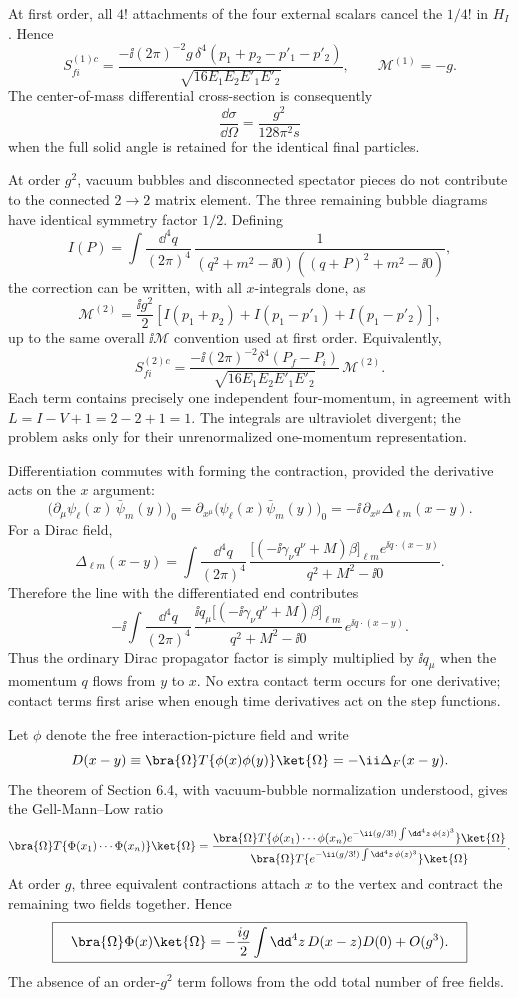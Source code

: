 \begin{enumerate}
At first order, all \(4!\) attachments of the four external scalars
cancel the \(1/4!\) in \(H_I\).  Hence
\[
 S^{(1)c}_{fi}
 =\frac{-\ii(2\pi)^{-2}g\,
 \delta^4(p_1+p_2-p'_1-p'_2)}
 {\sqrt{16E_1E_2E'_1E'_2}},
 \qquad \mathcal M^{(1)}=-g .
\]
The center-of-mass differential cross-section is consequently
\[
 \boxed{\quad
 \frac{\dd\sigma}{\dd\Omega}
 =\frac{g^2}{128\pi^2s}\quad}
\]
when the full solid angle is retained for the identical final particles.

At order \(g^2\), vacuum bubbles and disconnected spectator pieces do
not contribute to the connected \(2\to2\) matrix element.  The three
remaining bubble diagrams have identical symmetry factor \(1/2\).
Defining
\[
 I(P)=\int\frac{\dd^4q}{(2\pi)^4}\,
 \frac1{(q^2+m^2-\ii0)((q+P)^2+m^2-\ii0)},
\]
the correction can be written, with all \(x\)-integrals done, as
\[
 \mathcal M^{(2)}
 =\frac{\ii g^2}{2}\left[
 I(p_1+p_2)+I(p_1-p'_1)+I(p_1-p'_2)\right],
\]
up to the same overall \(\ii\mathcal M\) convention used at first order.
Equivalently,
\[
 S^{(2)c}_{fi}
 =\frac{-\ii(2\pi)^{-2}\delta^4(P_f-P_i)}
 {\sqrt{16E_1E_2E'_1E'_2}}\,
 \mathcal M^{(2)} .
\]
Each term contains precisely one independent four-momentum, in agreement
with \(L=I-V+1=2-2+1=1\).  The integrals are ultraviolet divergent; the
problem asks only for their unrenormalized one-momentum representation.

Differentiation commutes with forming the contraction, provided the
derivative acts on the \(x\) argument:
\[
 \bigl(\partial_\mu\psi_\ell(x)\,\bar\psi_m(y)\bigr)_0
 =\partial_{x^\mu}\bigl(\psi_\ell(x)\bar\psi_m(y)\bigr)_0
 =-\ii\,\partial_{x^\mu}\Delta_{\ell m}(x-y).
\]
For a Dirac field,
\[
 \Delta_{\ell m}(x-y)
 =\int\frac{\dd^4q}{(2\pi)^4}\,
 \frac{\bigl[(-\ii\gamma_\nu q^\nu+M)\beta\bigr]_{\ell m}
 e^{\ii q\cdot(x-y)}}{q^2+M^2-\ii0}.
\]
Therefore the line with the differentiated end contributes
\[
 -\ii\int\frac{\dd^4q}{(2\pi)^4}\,
 \frac{\ii q_\mu
 \bigl[(-\ii\gamma_\nu q^\nu+M)\beta\bigr]_{\ell m}}
 {q^2+M^2-\ii0}\,e^{\ii q\cdot(x-y)}.
\]
Thus the ordinary Dirac propagator factor is simply multiplied by
\(\ii q_\mu\) when the momentum \(q\) flows from \(y\) to \(x\).  No extra
contact term occurs for one derivative; contact terms first arise when
enough time derivatives act on the step functions.

Let \(\phi\) denote the free interaction-picture field and write
\[
 D(x-y)\equiv\bra{\Omega}T\{\phi(x)\phi(y)\}\ket{\Omega}
 =-\ii\Delta_F(x-y).
\]
The theorem of Section 6.4, with vacuum-bubble normalization understood,
gives the Gell-Mann--Low ratio
\[
 \bra{\Omega}T\{\Phi(x_1)\cdots\Phi(x_n)\}\ket{\Omega}
 =
 \frac{\bra{\Omega}T\{\phi(x_1)\cdots\phi(x_n)
 e^{-\ii(g/3!)\int \dd^4z\,\phi(z)^3}\}\ket{\Omega}}
 {\bra{\Omega}T\{e^{-\ii(g/3!)\int \dd^4z\,\phi(z)^3}\}\ket{\Omega}} .
\]
At order \(g\), three equivalent contractions attach \(x\) to the
vertex and contract the remaining two fields together.  Hence
\[
 \boxed{\quad
 \bra{\Omega}\Phi(x)\ket{\Omega}
 =-\frac{ig}{2}\int \dd^4z\,D(x-z)D(0)+O(g^3).\quad}
\]
The absence of an order-\(g^2\) term follows from the odd total number of
free fields.


\end{enumerate}
